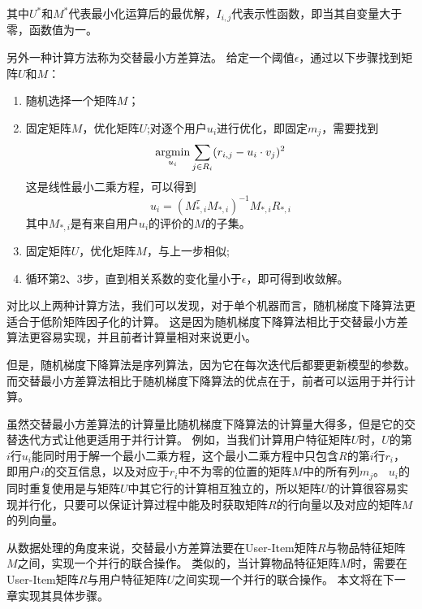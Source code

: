 其中$U^*$和$M^*$代表最小化运算后的最优解，$I_{i,j}$代表示性函数，即当其自变量大于零，函数值为一。

另外一种计算方法称为交替最小方差算法。
给定一个阈值$\epsilon$，通过以下步骤找到矩阵$U$和$M$：
\begin{enumerate}
	\item 随机选择一个矩阵$M$；
	\item 固定矩阵$M$，优化矩阵$U$;对逐个用户$u_i$进行优化，即固定$m_j$，需要找到
	\begin{equation}
	\mathop{\operatorname*{argmin}}_{u_i} \sum_{j\in R_i}(r_{i,j}-u_i\cdot v_j)^2
	\end{equation}
	这是线性最小二乘方程，可以得到
	\begin{equation}
	u_i=(M_{*,i}^{\tau}M_{*,i})^{-1}M_{*,i}R_{*,i}
	\end{equation}
	其中$M_{*,i}$是有来自用户$u_i$的评价的$M$的子集。
	\item 固定矩阵$U$，优化矩阵$M$，与上一步相似;
	\item 循环第2、3步，直到相关系数的变化量小于$\epsilon$，即可得到收敛解。
\end{enumerate}

对比以上两种计算方法，我们可以发现，对于单个机器而言，随机梯度下降算法更适合于低阶矩阵因子化的计算。
这是因为随机梯度下降算法相比于交替最小方差算法更容易实现，并且前者计算量相对来说更小。

但是，随机梯度下降算法是序列算法，因为它在每次迭代后都要更新模型的参数。
而交替最小方差算法相比于随机梯度下降算法的优点在于，前者可以运用于并行计算。

虽然交替最小方差算法的计算量比随机梯度下降算法的计算量大得多，但是它的交替迭代方式让他更适用于并行计算。
例如，当我们计算用户特征矩阵$U$时，$U$的第$i$行$u_i$能同时用于解一个最小二乘方程，这个最小二乘方程中只包含$R$的第$i$行$r_i$，即用户$i$的交互信息，以及对应于$r_i$中不为零的位置的矩阵$M$中的所有列$m_j$。
$u_i$的同时重复使用是与矩阵$U$中其它行的计算相互独立的，所以矩阵$U$的计算很容易实现并行化，只要可以保证计算过程中能及时获取矩阵$R$的行向量以及对应的矩阵$M$的列向量。

从数据处理的角度来说，交替最小方差算法要在User-Item矩阵$R$与物品特征矩阵$M$之间，实现一个并行的联合操作。
类似的，当计算物品特征矩阵$M$时，需要在User-Item矩阵$R$与用户特征矩阵$U$之间实现一个并行的联合操作。
本文将在下一章实现其具体步骤。








